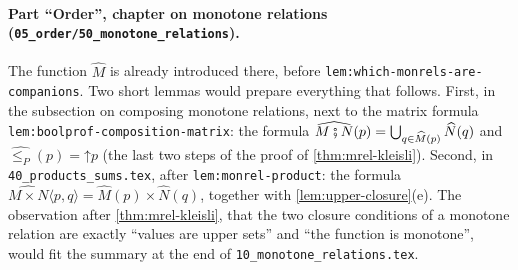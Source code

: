 \documentclass[11pt,a4paper]{article}
\theoremstyle{plain}
\theoremstyle{definition}
\theoremstyle{remark}
\newcommand{\then}{\mathbin{\fatsemi}}
\newcommand{\tup}[1]{\langle #1 \rangle}
\newcommand{\up}{\mathord{\uparrow}}
\newcommand{\lbl}[1]{\nolinkurl{#1}}
\newcommand{\file}[1]{\nolinkurl{#1}}
\begin{document}
\paragraph{Part ``Order'', chapter on monotone relations (\file{05_order/50_monotone_relations}).}
The function $\widehat{M}$ is already introduced there, before \lbl{lem:which-monrels-are-companions}.
Two short lemmas would prepare everything that follows.
First, in the subsection on composing monotone relations, next to the matrix formula \lbl{lem:boolprof-composition-matrix}: the formula $\widehat{M \then N}(p) = \bigcup_{q \in \widehat{M}(p)} \widehat{N}(q)$ and $\widehat{\leq_P}(p) = \up p$ (the last two steps of the proof of \cref{thm:mrel-kleisli}).
Second, in \file{40_products_sums.tex}, after \lbl{lem:monrel-product}: the formula $\widehat{M \times N}\tup{p,q} = \widehat{M}(p) \times \widehat{N}(q)$, together with \cref{lem:upper-closure}(e).
The observation after \cref{thm:mrel-kleisli}, that the two closure conditions of a monotone relation are exactly ``values are upper sets'' and ``the function is monotone'', would fit the summary at the end of \file{10_monotone_relations.tex}.
\end{document}

